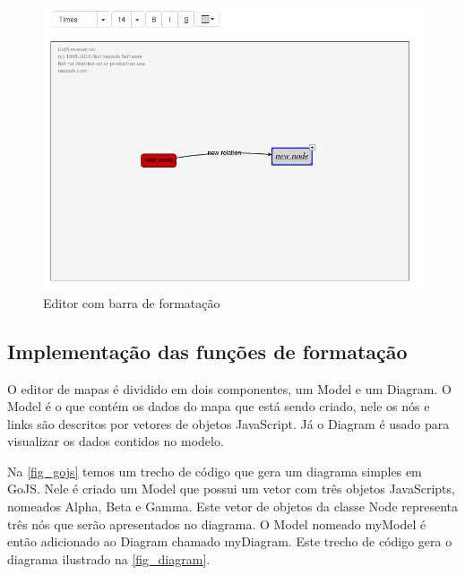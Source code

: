 \documentclass[
	12pt,				%
	openright,			%
	oneside,			%
	a4paper,			%
	english,			%
	french,				%
	spanish,			%
	brazil				%
	]{abntex2}
\begin{document}
\begin{figure}[htb]
	\caption{\label{fig_barraformacao} Editor com barra de formatação}
	\begin{center}
		\includegraphics[scale=0.5]{barraformacao.png}
	\end{center}
\end{figure}

\subsection{Implementação das funções de formatação}
O editor de mapas é dividido em dois componentes, um Model e um Diagram. O Model é o que contém os dados do mapa que está sendo criado, nele os nós e links são descritos por vetores de objetos JavaScript. Já o Diagram é usado para visualizar os dados contidos no modelo.

Na \autoref{fig_gojs} temos um trecho de código que gera um diagrama simples em GoJS. Nele é criado um Model que possui um vetor com três objetos JavaScripts, nomeados Alpha, Beta e Gamma. Este vetor de objetos da classe Node representa três nós que serão apresentados no diagrama. O Model nomeado myModel é então adicionado ao Diagram chamado myDiagram. Este trecho de código gera o diagrama ilustrado na \autoref{fig_diagram}.
\end{document}
